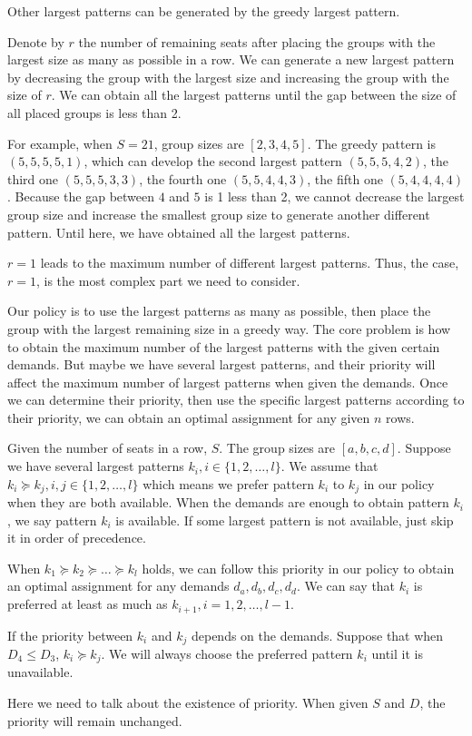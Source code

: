 \begin{lem}
Other largest patterns can be generated by the greedy largest pattern.
\end{lem}

Denote by $r$ the number of remaining seats after placing the groups with the largest size as many as possible in a row. We can generate a new largest pattern by decreasing the group with the largest size and increasing the group with the size of $r$. We can obtain all the largest patterns until the gap between the size of all placed groups is less than 2.

For example, when $S=21$, group sizes are $[2,3,4,5]$. The greedy pattern is $(5,5,5,5,1)$, which can develop the second largest pattern $(5,5,5,4,2)$, the third one $(5,5,5,3,3)$, the fourth one $(5,5,4,4,3)$, the fifth one $(5,4,4,4,4)$. Because the gap between $4$ and $5$ is 1 less than 2, we cannot decrease the largest group size and increase the smallest group size to generate another different pattern. Until here, we have obtained all the largest patterns.

\begin{remark}
$r=1$ leads to the maximum number of different largest patterns. Thus, the case, $r=1$, is the most complex part we need to consider.
\end{remark}

Our policy is to use the largest patterns as many as possible, then place the group with the largest remaining size in a greedy way. The core problem is how to obtain the maximum number of the largest patterns with the given certain demands. But maybe we have several largest patterns, and their priority will affect the maximum number of largest patterns when given the demands. Once we can determine their priority, then use the specific largest patterns according to their priority, we can obtain an optimal assignment for any given $n$ rows.

\begin{definition}
Given the number of seats in a row, $S$. The group sizes are $[a,b,c,d]$.
Suppose we have several largest patterns $k_i, i\in \{1,2,\ldots,l\}$. We assume that $k_i \succeq k_{j}, i, j\in \{1,2,\ldots,l\}$ which means we prefer pattern $k_i$ to $k_j$ in our policy when they are both available.
When the demands are enough to obtain pattern $k_i$, we say pattern $k_i$ is available. If some largest pattern is not available, just skip it in order of precedence.

When $k_1 \succeq k_2 \succeq \ldots \succeq k_l$ holds, we can follow this priority in our policy to obtain an optimal assignment for any demands $d_a, d_b, d_c, d_d$.
We can say that $k_i$ is preferred at least as much as $k_{i+1}, i = 1,2,\ldots, l-1$.

If the priority between $k_i$ and $k_j$ depends on the demands. Suppose that when $D_4 \leq D_3$, $k_i \succeq k_j$. We will always choose the preferred pattern $k_i$ until it is unavailable.

Here we need to talk about the existence of priority.
When given $S$ and $D$, the priority will remain unchanged.

\end{definition}

